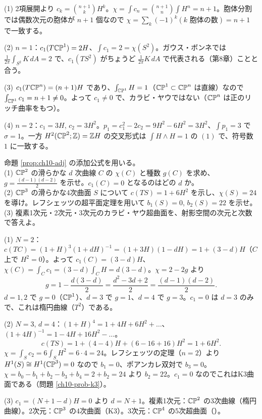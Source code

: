 \begin{solution}
(1) 2項展開より $c_k=\binom{n+1}{k}H^k$。$\chi=\int c_n=\binom{n+1}{n}\int H^n=n+1$。胞体分割では偶数次元の胞体が $n+1$ 個なので $\chi=\sum_k(-1)^k(\text{$k$ 胞体の数})=n+1$ で一致する。

(2) $n=1$：$c_1(T\mathbb{CP}^1)=2H$、$\int c_1=2=\chi(S^2)$。ガウス・ボンネでは $\frac{1}{2\pi}\int_{S^2}K\,dA=2$ で、$c_1(TS^2)$ がちょうど $\frac{1}{2\pi}K\,dA$ で代表される（第8章）ことと合う。

(3) $c_1(T\mathbb{CP}^n)=(n+1)H$ であり、$\int_{\mathbb{CP}^1}H=1$（$\mathbb{CP}^1\subset\mathbb{CP}^n$ は直線）なので $\int_{\mathbb{CP}^1}c_1=n+1\ne0$。よって $c_1\ne0$ で、カラビ・ヤウではない（$\mathbb{CP}^n$ は正のリッチ曲率をもつ）。

(4) $n=2$：$c_1=3H$, $c_2=3H^2$。$p_1=c_1^2-2c_2=9H^2-6H^2=3H^2$、$\int p_1=3$ で $\sigma=1$。一方 $H^2(\mathbb{CP}^2;\mathbb{Z})=\mathbb{Z} H$ の交叉形式は $\int H\wedge H=1$ の $(1)$ で、符号数 $1$ に一致する。
\end{solution}

\begin{problem}[難易度 B]\label{ch10-prob-adj}
命題 \ref{prop:ch10-adj} の添加公式を用いる。\\
(1) $\mathbb{CP}^2$ の滑らかな $d$ 次曲線 $C$ の $\chi(C)$ と種数 $g(C)$ を求め、$g=\frac{(d-1)(d-2)}{2}$ を示せ。$c_1(C)=0$ となるのはどの $d$ か。\\
(2) $\mathbb{CP}^3$ の滑らかな4次曲面 $S$ について $c(TS)=1+6H^2$ を示し、$\chi(S)=24$ を導け。レフシェッツの超平面定理を用いて $b_1(S)=0$, $b_2(S)=22$ を示せ。\\
(3) 複素1次元・2次元・3次元のカラビ・ヤウ超曲面を、射影空間の次元と次数で答えよ。
\end{problem}

\begin{solution}
(1) $N=2$：$c(TC)=(1+H)^3(1+dH)^{-1}=(1+3H)(1-dH)=1+(3-d)H$（$C$ 上で $H^2=0$）。よって $c_1(C)=(3-d)H$、$\chi(C)=\int_Cc_1=(3-d)\int_CH=d(3-d)$。$\chi=2-2g$ より
\[
g=1-\frac{d(3-d)}{2}=\frac{d^2-3d+2}{2}=\frac{(d-1)(d-2)}{2}.
\]
$d=1,2$ で $g=0$（$\mathbb{CP}^1$）、$d=3$ で $g=1$、$d=4$ で $g=3$。$c_1=0$ は $d=3$ のみで、これは楕円曲線（$T^2$）である。

(2) $N=3$, $d=4$：$(1+H)^4=1+4H+6H^2+\dots$、$(1+4H)^{-1}=1-4H+16H^2-\dots$。
\[
c(TS)=1+(4-4)H+(6-16+16)H^2=1+6H^2.
\]
$\chi=\int_Sc_2=6\int_SH^2=6\cdot4=24$。レフシェッツの定理（$n=2$）より $H^1(S)\cong H^1(\mathbb{CP}^3)=0$ なので $b_1=0$、ポアンカレ双対で $b_3=0$。$\chi=b_0-b_1+b_2-b_3+b_4=2+b_2=24$ より $b_2=22$。$c_1=0$ なのでこれはK3曲面である（問題 \ref{ch10-prob-k3}）。

(3) $c_1=(N+1-d)H=0$ より $d=N+1$。複素1次元：$\mathbb{CP}^2$ の3次曲線（楕円曲線）。2次元：$\mathbb{CP}^3$ の4次曲面（K3）。3次元：$\mathbb{CP}^4$ の5次超曲面（）。
\end{solution}

